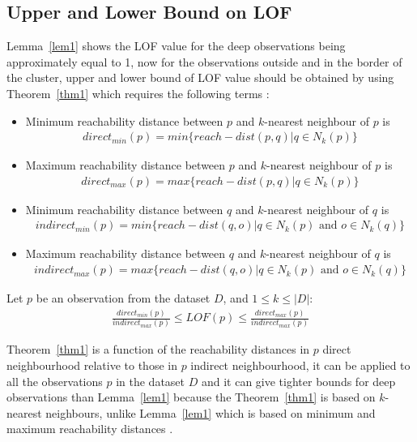 \subsection{Upper and Lower Bound on LOF}
Lemma~\ref{lem1} shows the LOF value for the deep observations being approximately equal to 1, now for the observations outside and in the border of the cluster, upper and lower bound of LOF value should be obtained by using Theorem~\ref{thm1} which requires the following terms \citep{Markus}:
\begin{itemize}
\item{Minimum reachability distance between $p$ and $k$-nearest neighbour of $p$ is}
\begin{align}
direct_{min}(p) = min \lbrace reach-dist(p,q) | q \in N_{k}(p) \rbrace
\end{align}
\item{Maximum reachability distance between $p$ and $k$-nearest neighbour of $p$ is}
\begin{align}
direct_{max}(p) = max \lbrace reach-dist(p,q) | q \in N_{k}(p) \rbrace
\end{align}
\item{Minimum reachability distance between $q$ and $k$-nearest neighbour of $q$ is}
\begin{align}
indirect_{min}(p) = min \lbrace reach-dist(q,o) | q \in N_{k}(p) \text{ and } o \in N_{k}(q) \rbrace
\end{align}
\item{Maximum reachability distance between $q$ and $k$-nearest neighbour of $q$ is}
\begin{align}
indirect_{max}(p) = max \lbrace reach-dist(q,o) | q \in N_{k}(p) \text{ and } o \in N_{k}(q) \rbrace
\end{align}
\end{itemize}
\begin{thm}\label{thm1}
Let $p$ be an observation from the dataset $D$, and $1 \leq k \leq |D|$:
\begin{align}
\frac{direct_{min}(p)}{indirect_{max}(p)} \leq LOF(p) \leq \frac{direct_{max}(p)}{indirect_{max}(p)}
\end{align}
\end{thm}
Theorem~\ref{thm1} is a function of the reachability distances in $p$ direct neighbourhood relative to those in $p$ indirect neighbourhood, it can be applied to all the observations $p$ in the dataset $D$ and it can give tighter bounds for deep observations than Lemma~\ref{lem1} because the Theorem~\ref{thm1} is based on $k$-nearest neighbours, unlike Lemma~\ref{lem1} which is based on minimum and maximum reachability distances \citep{Markus}.
